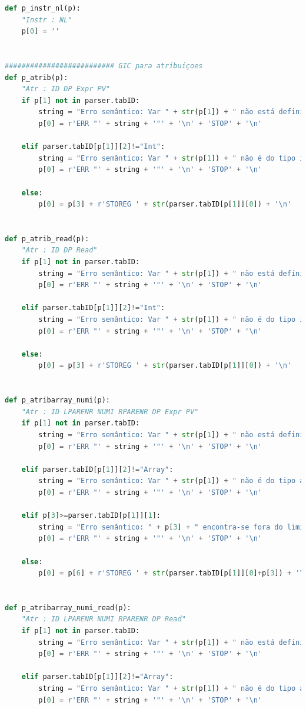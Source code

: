 \documentclass{article}
\begin{document}
\begin{lstlisting}[language=Python]
def p_instr_nl(p):
    "Instr : NL"
    p[0] = ''


########################## GIC para atribuiçoes
def p_atrib(p):
    "Atr : ID DP Expr PV"
    if p[1] not in parser.tabID:
        string = "Erro semântico: Var " + str(p[1]) + " não está definida!"
        p[0] = r'ERR "' + string + '"' + '\n' + 'STOP' + '\n'

    elif parser.tabID[p[1]][2]!="Int":
        string = "Erro semântico: Var " + str(p[1]) + " não é do tipo inteiro!"
        p[0] = r'ERR "' + string + '"' + '\n' + 'STOP' + '\n'     
    
    else:
        p[0] = p[3] + r'STOREG ' + str(parser.tabID[p[1]][0]) + '\n'
    

def p_atrib_read(p):
    "Atr : ID DP Read"
    if p[1] not in parser.tabID:
        string = "Erro semântico: Var " + str(p[1]) + " não está definida!"
        p[0] = r'ERR "' + string + '"' + '\n' + 'STOP' + '\n'

    elif parser.tabID[p[1]][2]!="Int":
        string = "Erro semântico: Var " + str(p[1]) + " não é do tipo inteiro!"
        p[0] = r'ERR "' + string + '"' + '\n' + 'STOP' + '\n'

    else:
        p[0] = p[3] + r'STOREG ' + str(parser.tabID[p[1]][0]) + '\n'


def p_atribarray_numi(p):
    "Atr : ID LPARENR NUMI RPARENR DP Expr PV"
    if p[1] not in parser.tabID:
        string = "Erro semântico: Var " + str(p[1]) + " não está definida!"
        p[0] = r'ERR "' + string + '"' + '\n' + 'STOP' + '\n'

    elif parser.tabID[p[1]][2]!="Array":
        string = "Erro semântico: Var " + str(p[1]) + " não é do tipo array!"
        p[0] = r'ERR "' + string + '"' + '\n' + 'STOP' + '\n'

    elif p[3]>=parser.tabID[p[1]][1]:
        string = "Erro semântico: " + p[3] + " encontra-se fora do limite do tamanho do array!"
        p[0] = r'ERR "' + string + '"' + '\n' + 'STOP' + '\n'

    else:
        p[0] = p[6] + r'STOREG ' + str(parser.tabID[p[1]][0]+p[3]) + '\n'


def p_atribarray_numi_read(p):
    "Atr : ID LPARENR NUMI RPARENR DP Read"
    if p[1] not in parser.tabID:
        string = "Erro semântico: Var " + str(p[1]) + " não está definida!"
        p[0] = r'ERR "' + string + '"' + '\n' + 'STOP' + '\n'

    elif parser.tabID[p[1]][2]!="Array":
        string = "Erro semântico: Var " + str(p[1]) + " não é do tipo array!"
        p[0] = r'ERR "' + string + '"' + '\n' + 'STOP' + '\n'


\end{lstlisting}
\end{document}
